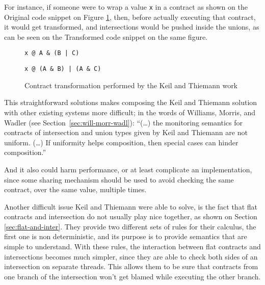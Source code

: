 \documentclass[sigplan,10pt,review,anonymous]{acmart}
\newcommand{\unsure}[2][1=]{}
\newcommand{\info}[2][1=]{}
\newcommand{\nickel}[1]{\lstinline[language=nickel]{#1}}
\begin{document}
For instance, if someone were to wrap a value \nickel{x}
in a contract as shown on the Original code snippet on Figure
\ref{fig:kt-contract-transf}, then, before actually executing that
contract, it would get transformed, and intersections would
be pushed inside the unions, as can be seen on the Transformed
code snippet on the same figure.

\begin{figure}[h]
\begin{lstlisting}[language=nickel, title=Original]
x @ A & (B | C)
\end{lstlisting}
\begin{lstlisting}[language=nickel, title=Transformed]
x @ (A & B) | (A & C)
\end{lstlisting}
\caption{Contract transformation performed by the Keil and
Thiemann work}
\label{fig:kt-contract-transf}
\end{figure}

This straightforward solutions makes composing the Keil and Thiemann
solution with other existing systems more difficult; in the words
of Williams, Morris, and Wadler (see Section~\ref{sec:will-morr-wadl}):
``(\ldots) the monitoring semantics for contracts of intersection and union types given by Keil
and Thiemann are not uniform. (\ldots) If uniformity helps composition, then
special cases can hinder composition.''\cite{RootCauseOfBlame}
\info{(Yann) Does
it also make it less efficient? If $(A \& B)$ fails because of $B$, their
development causes to recheck the contract $A$ that has been duplicated?}
And it also could harm performance, or at least complicate an implementation,
since some sharing mechanism should be used to avoid checking the same contract,
over the same value, multiple times.\unsure{Arnaud says: this whole
  section is too abstract give concrete code and explain what goes
  wrong. It's fine to give code in Nickel syntax}

Another difficult issue Keil and Thiemann were able to solve, is the
fact that flat contracts and intersection do not usually play nice
together, as shown on Section \ref{sec:flat-and-inter}.
They provide two different sets of rules for their calculus,
the first one is non deterministic, and its purpose is to provide
semantics that are simple to understand.
With these rules, the interaction between flat contracts and
intersections becomes much simpler, since they are able to check
both sides of an intersection on separate threads.
This allows them to be sure that contracts from one branch of the intersection
won't get blamed while executing the other branch.
\end{document}
